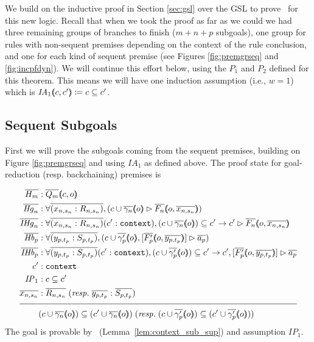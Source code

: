 We build on the inductive proof in Section \ref{sec:gsl} over the GSL to prove~ for this new logic. Recall that when we took the proof as far as we could we had three remaining groups of branches to finish ($m + n + p$ subgoals), one group for rules with non-sequent premises depending on the context of the rule conclusion, and one for each kind of sequent premise (see Figures \ref{fig:premgrseq} and \ref{fig:incpfdyn}). We will continue this effort below, using the $P_1$ and $P_2$ defined for this theorem. This means we will have one induction assumption (i.e., $w = 1$) which is $\mathit{IA}_1 (\hspace{-0.35em} \langle c , c'{} \rangle \hspace{-0.35em}) \coloneqq c \subseteq c'{}$.

\subsection{Sequent Subgoals}

First we will prove the subgoals coming from the sequent premises, building on Figure \ref{fig:premgrseq} and using $\mathit{IA}_1$ as defined above. The proof state for goal-reduction (resp. backchaining) premises is

\begin{align*}
\ol{H_m} &: \ol{Q_m} \args{c , o} \\
\ol{\mathit{Hg}_n} &: \forall \ol{(x_{n,s_n} : R_{n,s_n})}, (\seqsl[c \cup \ol{\gamma_n} \args{o}]{\ol{F_n} \args{o , \ol{x_{n,s_n}}})} \\
\ol{\mathit{IHg}_n} &: \forall \ol{(x_{n,s_n} : R_{n,s_n})} (\inddyncon{} : \sltm{context}), (c \cup \ol{\gamma_n} \args{o}) \subseteq \inddyncon{} \rightarrow \seqsl[\inddyncon{}]{\ol{F_n} \args{o , \ol{x_{n,s_n}}}} \\
\ol{\mathit{Hb}_p} &: \forall \ol{(y_{p,t_p} : S_{p,t_p})}, (\bchsl[c \cup \ol{\gamma'_p} \args{o}]{\ol{F'_p} \args{o , \ol{y_{p,t_p}}}}{\ol{a_p}}) \\
\ol{\mathit{IHb}_p} &: \forall \ol{(y_{p,t_p} : S_{p,t_p})} (\inddyncon{} : \sltm{context}), (c \cup \ol{\gamma'_p} \args{o}) \subseteq \inddyncon{} \rightarrow \bchsl[\inddyncon{}]{\ol{F'_p} \args{o , \ol{y_{p,t_p}}}}{\ol{a_p}} \\
\inddyncon{} &: \sltm{context} \\
\mathit{IP}_1 &: c \subseteq \inddyncon{} \\
\ol{x_{n,s_n}} &: \ol{R_{n,s_n}} \; (\mathit{resp.} \; \ol{y_{p,t_p}} : \ol{S_{p,t_p}}) \\[\pfshift{}]
\cline{1-2}
& (c \cup \ol{\gamma_n} \args{o}) \subseteq (\inddyncon{} \cup \ol{\gamma_n} \args{o}) \; (\mathit{resp.} \; (c \cup \ol{\gamma'_p} \args{o}) \subseteq (\inddyncon{} \cup \ol{\gamma'_p} \args{o}))
\end{align*}
The goal is provable by~ (Lemma~\ref{lem:context_sub_sup}) and assumption $\mathit{IP}_1$.


